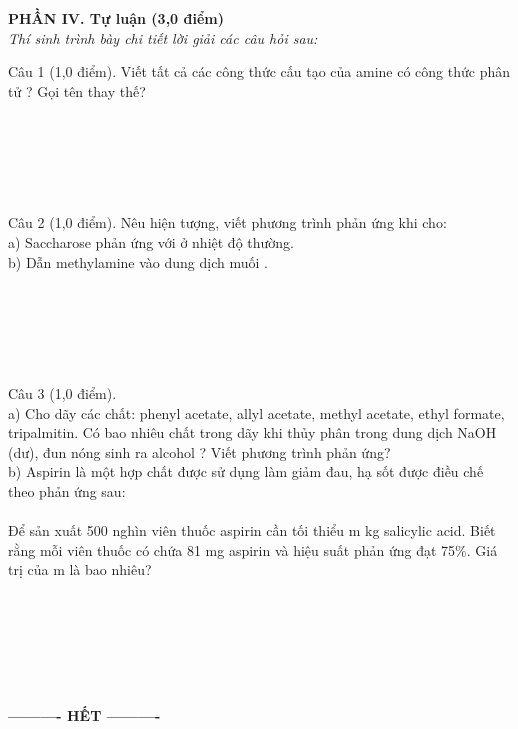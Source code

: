 \documentclass[11pt,a4paper]{article}
\begin{document}
\vspace{4pt}
\noindent\textbf{\large\color{mainGreen}PHẦN IV. Tự luận (3,0 điểm)}\\
\textit{Thí sinh trình bày chi tiết lời giải các câu hỏi sau:}
\vspace{4pt}

Câu 1 (1,0 điểm). Viết tất cả các công thức cấu tạo của amine có công thức phân tử ? Gọi tên thay thế?\\[2pt]
\par\noindent\dotfill\\
\noindent\dotfill\\
\noindent\dotfill\\
\noindent\dotfill\\
\noindent\dotfill\\[4pt]
\vspace{2pt}
Câu 2 (1,0 điểm). Nêu hiện tượng, viết phương trình phản ứng khi cho:\\
a) Saccharose phản ứng với  ở nhiệt độ thường.\\
b) Dẫn methylamine vào dung dịch muối .\\[2pt]
\par\noindent\dotfill\\
\noindent\dotfill\\
\noindent\dotfill\\
\noindent\dotfill\\
\noindent\dotfill\\[4pt]
\vspace{2pt}
Câu 3 (1,0 điểm).\\
a) Cho dãy các chất: phenyl acetate, allyl acetate, methyl acetate, ethyl formate, tripalmitin. Có bao nhiêu chất trong dãy khi thủy phân trong dung dịch NaOH (dư), đun nóng sinh ra alcohol ? Viết phương trình phản ứng?\\
b) Aspirin là một hợp chất được sử dụng làm giảm đau, hạ sốt được điều chế theo phản ứng sau:\\
\\
Để sản xuất 500 nghìn viên thuốc aspirin cần tối thiểu m kg salicylic acid. Biết rằng mỗi viên thuốc có chứa 81 mg aspirin và hiệu suất phản ứng đạt 75\%. Giá trị của m là bao nhiêu?\\[2pt]
\par\noindent\dotfill\\
\noindent\dotfill\\
\noindent\dotfill\\
\noindent\dotfill\\
\noindent\dotfill\\[4pt]
\vspace{2pt}

\begin{center}
\textbf{---------- HẾT ----------}
\end{center}
\end{document}
